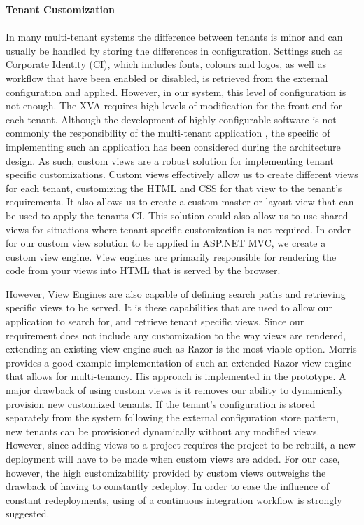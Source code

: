\textbf{Tenant Customization}
\\
\\
\label{sec:viewengine}
In many multi-tenant systems the difference between tenants is minor and can usually be handled by storing the differences in configuration. Settings such as Corporate Identity (CI), which includes fonts, colours and logos, as well as workflow that have been enabled or disabled, is retrieved from the external configuration and applied. However, in our system, this level of configuration is not enough. The XVA requires high levels of modification for the front-end for each tenant. Although the development of highly configurable software is not commonly the responsibility of the multi-tenant application \cite{Krebs2012}, the specific of implementing such an application has been considered during the architecture design. As such, custom views are a robust solution for implementing tenant specific customizations. Custom views effectively allow us to create different views for each tenant, customizing the HTML and CSS for that view to the tenant's requirements. It also allows us to create a custom master or layout view that can be used to apply the tenants CI. This solution could also allow us to use shared views for situations where tenant specific customization is not required. In order for our custom view solution to be applied in ASP.NET  MVC, we create a custom view engine. View engines are primarily responsible for rendering the code from your views into HTML that is served by the browser.

However, View Engines are also capable of defining search paths and retrieving specific views to be served. It is these capabilities that are used to allow our application to search for, and retrieve tenant specific views. Since our requirement does not include any customization to the way views are rendered, extending an existing view engine such as Razor is the most viable option. Morris \cite{Morris} provides a good example implementation of such an extended Razor view engine that allows for multi-tenancy. His approach is implemented in the prototype. A major drawback of using custom views is it removes our ability to dynamically provision new customized tenants. If the tenant's configuration is stored separately from the system following the external configuration store pattern, \cite{Homer2014} new tenants can be provisioned dynamically without any modified views. However, since adding views to a project requires the project to be rebuilt, a new deployment will have to be made when custom views are added. For our case, however, the high customizability provided by custom views outweighs the drawback of having to constantly redeploy. In order to ease the influence of constant redeployments, using of a continuous integration workflow is strongly suggested.


